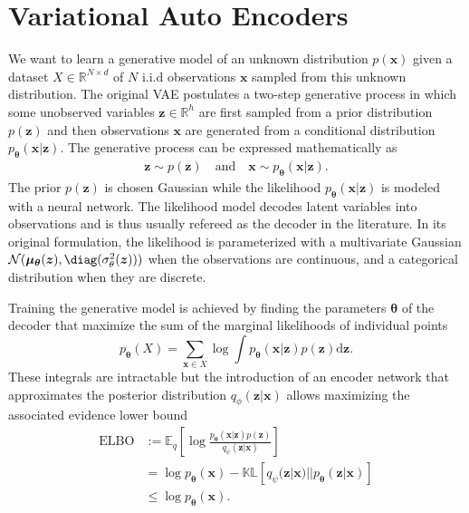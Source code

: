 \section{Variational Auto Encoders}
We want to learn a generative model of an unknown distribution $p(\mathbf{x})$ given a dataset $X \in \mathbb{R}^{N\times d}$ of $N$ i.i.d observations $\mathbf{x}$ sampled from this unknown distribution.
The original VAE postulates a two-step generative process in which some unobserved variables $\mathbf{z} \in \mathbb{R}^h$ are first sampled from a prior distribution $p(\mathbf{z})$ and then observations $\mathbf{x}$ are generated from a conditional distribution $p_{\mathbf{\theta}}(\mathbf{x}|\mathbf{z})$. The generative process can be expressed mathematically as
\begin{align}
     \mathbf{z} \sim p(\mathbf{z}) \quad \text{and} \quad \mathbf{x} \sim p_{\mathbf{\theta}}(\mathbf{x}|\mathbf{z}).
\end{align}
The prior $p(\mathbf{z})$ is chosen Gaussian while the likelihood $p_{\mathbf{\theta}}(\mathbf{x}|\mathbf{z})$ is modeled with a neural network. The likelihood model decodes latent variables into observations and is thus usually refereed as the decoder in the literature. In its original formulation, the likelihood is parameterized with a multivariate Gaussian $\mathcal{N}(\mathbf{\mu}_{\mathbf{\theta}}(\mathbf{z}), \diag(\sigma_{\theta}^2(\mathbf{z})))$ when the observations are continuous, and a categorical distribution when they are discrete.

Training the generative model is achieved by finding the parameters $\mathbf{\theta}$ of the decoder that maximize the sum of the marginal likelihoods of individual points $$p_{\mathbf{\theta}}(X)= \sum_{\mathbf{x}\in X}\log \int p_{\mathbf{\theta}}(\mathbf{x}|\mathbf{z}) p(\mathbf{z}) \text{d}\mathbf{z}.$$
These integrals are intractable but the introduction of an encoder network that approximates the posterior distribution $q_\phi(\mathbf{z}|\mathbf{x})$ allows maximizing the associated evidence lower bound
\begin{align}
    \operatorname{ELBO}&:=\mathbb{E}_q\left[\log \frac{p_{\mathbf{\theta}} (\mathbf{x}|\mathbf{z}) p(\mathbf{z})}{q_\psi(\mathbf{z}|\mathbf{x})} \right]\label{eq:ELBO_VAE}\\
    &=\log p_{\mathbf{\theta}}(\mathbf{x}) - \mathbb{KL}\left[q_\psi(\mathbf{z}|\mathbf{x})||p_{\mathbf{\theta}} (\mathbf{z}|\mathbf{x})\right]\\
    &\leq \log p_{\mathbf{\theta}}(\mathbf{x}).
\end{align}

